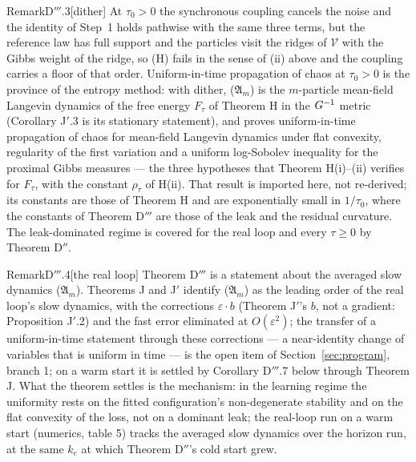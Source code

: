\begin{rmk}{Remark}{D$'''$.3}[dither]
At $\tau_0 > 0$ the synchronous coupling cancels the noise and the identity of Step~1 holds pathwise with the same
three terms, but the reference law has full support and the particles visit the ridges of $\mathcal{V}$ with the
Gibbs weight of the ridge, so (H) fails in the sense of (ii) above and the coupling carries a floor of that order.
Uniform-in-time propagation of chaos at $\tau_0 > 0$ is the province of the entropy method: with dither,
\textup{($\mathfrak{A}_m$)} is the $m$-particle mean-field Langevin dynamics of the free energy $F_\tau$ of Theorem H
in the $G^{-1}$ metric (Corollary J$'$.3 is its stationary statement), and \cite{S5} proves uniform-in-time
propagation of chaos for mean-field Langevin dynamics under flat convexity, regularity of the first variation and a
uniform log-Sobolev inequality for the proximal Gibbs measures --- the three hypotheses that Theorem H(i)--(ii)
verifies for $F_\tau$, with the constant $\rho_\tau$ of H(ii). That result is imported here, not re-derived; its
constants are those of Theorem H and are exponentially small in $1/\tau_0$, where the constants of Theorem D$'''$
are those of the leak and the residual curvature. The leak-dominated regime is covered for the real loop and every
$\tau\ge0$ by Theorem D$''$.
\end{rmk}

\begin{rmk}{Remark}{D$'''$.4}[the real loop]
Theorem D$'''$ is a statement about the averaged slow dynamics \textup{($\mathfrak{A}_m$)}. Theorems J and J$'$
identify \textup{($\mathfrak{A}_m$)} as the leading order of the real loop's slow dynamics, with the corrections
$\varepsilon\cdot b$ (Theorem J$'$'s $b$, not a gradient: Proposition J$'$.2) and the fast error eliminated at
$O(\varepsilon^2)$; the transfer of a uniform-in-time statement through these corrections --- a near-identity change
of variables that is uniform in time --- is the open item of Section~\ref{sec:program}, branch 1; on a warm start it
is settled by Corollary D$'''$.7 below through Theorem J. What the theorem settles is the mechanism: in the learning
regime the uniformity rests on the fitted configuration's non-degenerate stability and on the flat convexity of the
loss, not on a dominant leak; the real-loop run on a warm start (numerics, table 5) tracks the averaged slow
dynamics over the horizon run, at the same $k_e$ at which Theorem D$''$'s cold start grew.
\end{rmk}

